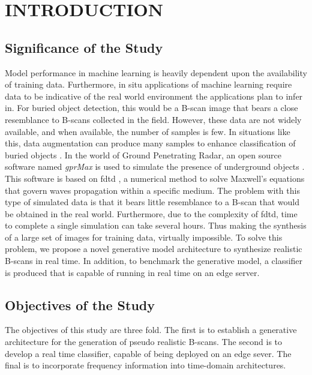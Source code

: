 \doublespacing
\chapter{INTRODUCTION}

\section{Significance of the Study}
 Model performance in machine learning is heavily dependent upon the availability of training data. Furthermore, in situ applications of machine learning require data to be indicative of the real world environment the applications plan to infer in. For buried object detection, this would be a B-scan image that bears a close resemblance to B-scans collected in the field. However, these data are not widely available, and when available, the number of samples is few. In situations like this, data augmentation can produce many samples to enhance classification of buried objects  \cite{DBLP}. In the world of Ground Penetrating Radar, an open source software named \textit{gprMax} is used to simulate the presence of underground objects \cite{gprMax}. This software is based on \acrfull{fdtd} \cite{FDTD}, a numerical method to solve Maxwell's equations that govern waves propagation within a specific medium. The problem with this type of simulated data is that it bears little resemblance to a B-scan that would be obtained in the real world. Furthermore, due to the complexity of \acrshort{fdtd}, time to complete a single simulation can take several hours. Thus making the synthesis of a large set of images for training data, virtually impossible. To solve this problem, we propose a novel generative model architecture to synthesize realistic B-scans in real time. In addition, to benchmark the generative model, a classifier is produced that is capable of running in real time on an edge server.


\section{Objectives of the Study}

The objectives of this study are three fold. The first is to establish a generative architecture for the generation of pseudo realistic B-scans. The second is to develop a real time classifier, capable of being deployed on an edge sever. The final is to incorporate frequency information into time-domain architectures.

